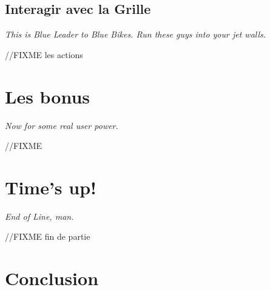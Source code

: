         \subsection{Interagir avec la Grille}
        \emph{This is Blue Leader to Blue Bikes. Run these guys into your jet walls.}

        //FIXME les actions


\newpage
\section{Les bonus} \label{section-bonus}
\emph{Now for some real user power.}

//FIXME

\newpage
\section{Time's up!}
\emph{End of Line, man.}

//FIXME fin de partie

\newpage
\section{Conclusion}
